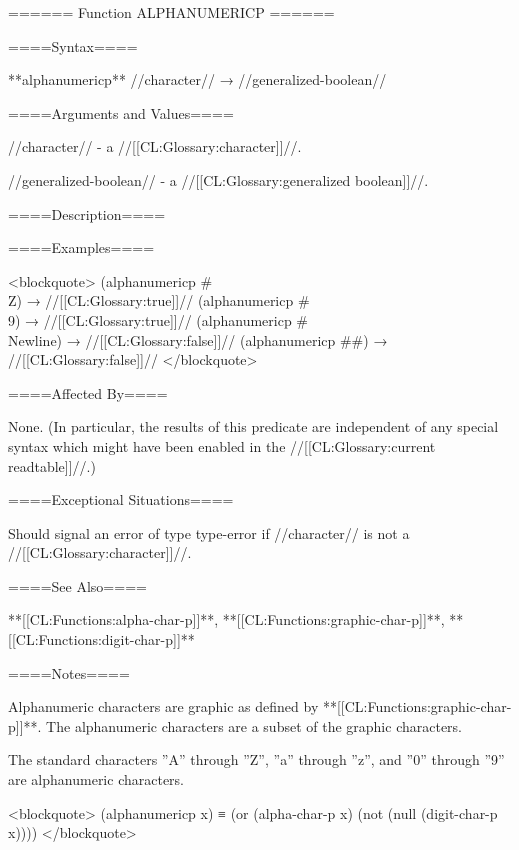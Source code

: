 ====== Function ALPHANUMERICP ======

====Syntax====

**alphanumericp** //character// → //generalized-boolean//

====Arguments and Values====

//character// - a //[[CL:Glossary:character]]//.

//generalized-boolean// - a //[[CL:Glossary:generalized boolean]]//.

====Description====


====Examples====

<blockquote> (alphanumericp #\\Z) → //[[CL:Glossary:true]]// (alphanumericp #\\9) → //[[CL:Glossary:true]]// (alphanumericp #\\Newline) → //[[CL:Glossary:false]]// (alphanumericp #\#) → //[[CL:Glossary:false]]// </blockquote>

====Affected By====

None. (In particular, the results of this predicate are independent of any special syntax which might have been enabled in the //[[CL:Glossary:current readtable]]//.)

====Exceptional Situations====

Should signal an error of type type-error if //character// is not a //[[CL:Glossary:character]]//.

====See Also====

**[[CL:Functions:alpha-char-p]]**, **[[CL:Functions:graphic-char-p]]**, **[[CL:Functions:digit-char-p]]**

====Notes====

Alphanumeric characters are graphic as defined by **[[CL:Functions:graphic-char-p]]**. The alphanumeric characters are a subset of the graphic characters.

The standard characters ''A'' through ''Z'', ''a'' through ''z'', and ''0'' through ''9'' are alphanumeric characters.

<blockquote> (alphanumericp x) ≡ (or (alpha-char-p x) (not (null (digit-char-p x)))) </blockquote>

